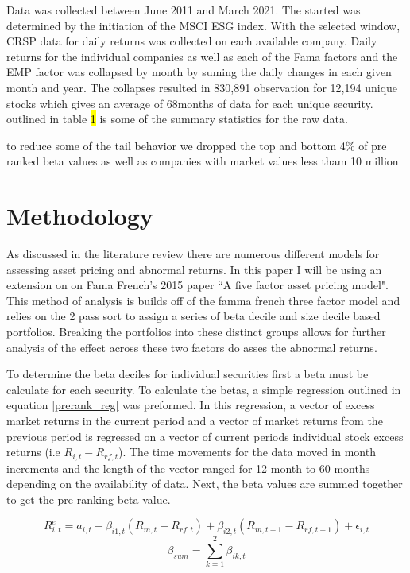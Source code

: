 \documentclass[12pt,oneside,reqno]{amsart}
\begin{document}
 
 
 Data was collected between June 2011 and March 2021. The started was determined by the initiation of the MSCI ESG index. With the selected window, CRSP data for daily returns was collected on each available company. Daily returns for the individual companies as well as each of the Fama factors and the EMP factor was collapsed by month by suming the daily changes in each given month and year. The collapses resulted in 830,891 observation for 12,194 unique stocks which gives an average of 68months of data for each unique security.  outlined in table \hl{1} is some of the summary statistics for the raw data.

to reduce some of the tail behavior we dropped the top and bottom  4\% of pre ranked beta values as well as companies with market values less tham 10 million
\section{Methodology}
\label{Methodology}
As discussed in the literature review there are numerous different models for assessing asset pricing and abnormal returns. In this paper I will be using an extension on on Fama French's 2015 paper ``A five factor asset pricing model". This method of analysis is builds off of the famma french three factor model and relies on the 2 pass sort to assign a series of beta decile and size decile based portfolios. Breaking the portfolios into these distinct groups allows for further analysis of the effect across these two factors do asses the abnormal returns. 

To determine the beta deciles for individual securities first a beta must be calculate for each security. To calculate the betas, a  simple regression outlined in equation \eqref{prerank_reg} was preformed. In this regression, a vector of  excess market returns in the current period and a vector of market returns from the previous period is regressed on a vector of current periods individual stock excess returns (i.e $R_{i,t}-R_{rf,t}$). The time movements for the data moved in month increments and the length of the vector ranged for 12 month to 60 months depending on the availability of data. Next, the beta values are summed together to get the pre-ranking beta value. 

\begin{equation}
    R_{i,t}^e = a_{i,t} + \beta_{i1,t}(R_{m,t}-R_{rf,t})+\beta_{i2,t}(R_{m,t-1}-R_{rf,t-1})+\epsilon_{i,t}
    \label{prerank_reg}
\end{equation}
\begin{equation}
    \beta_{sum} = \sum_{k=1}^2\beta_{ik,t}
\end{equation}
\end{document}
